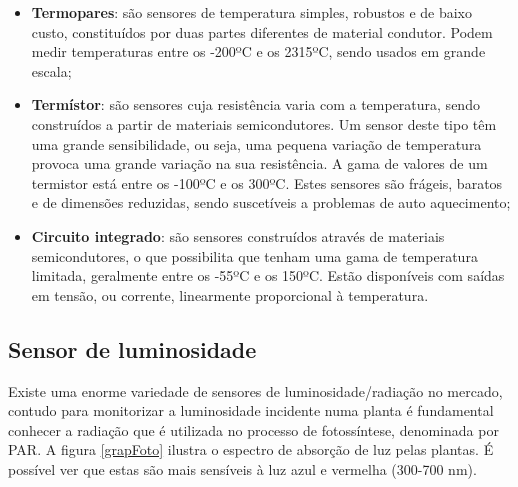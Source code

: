 \begin{itemize}
	\item \textbf{Termopares}: são sensores de temperatura simples, robustos e de baixo custo, constituídos por duas partes diferentes de material condutor. Podem medir temperaturas entre os -200ºC e os 2315ºC, sendo usados em grande escala\cite{REOTEMPInstrumentCorporation}; 
	 
	
	\item \textbf{Termístor}: são sensores cuja resistência varia com a temperatura, sendo construídos a partir de materiais semicondutores. Um sensor deste tipo têm uma grande sensibilidade, ou seja, uma pequena variação de temperatura provoca uma grande variação na sua resistência. A gama de valores de um termistor está entre os -100ºC e os 300ºC. Estes sensores são frágeis, baratos e de dimensões reduzidas, sendo suscetíveis a problemas de auto aquecimento\cite{TemperatureSensors};
	

	\item \textbf{Circuito integrado}: são sensores construídos através de materiais semicondutores, o que possibilita que tenham uma gama de temperatura limitada, geralmente entre os -55ºC e os 150ºC. 	Estão disponíveis com saídas em tensão, ou corrente, linearmente proporcional à temperatura. 


\end{itemize}





\subsection{Sensor de luminosidade }




Existe uma enorme variedade de sensores de luminosidade/radiação no mercado, contudo para monitorizar a luminosidade incidente numa planta é fundamental conhecer a radiação que é utilizada no processo de fotossíntese, denominada por \ac{PAR}. A figura \ref{grapFoto} ilustra o espectro de absorção de luz pelas plantas. É possível ver que estas são mais sensíveis à luz azul e vermelha (300-700 nm).





